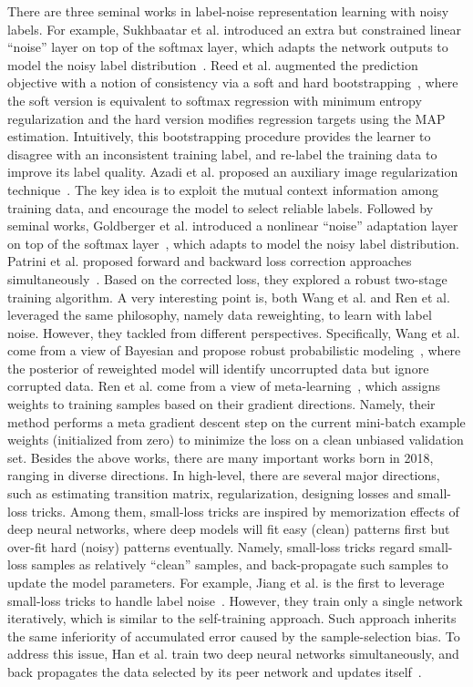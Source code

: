 There are three seminal works in label-noise representation learning with noisy labels. For example, Sukhbaatar et al. introduced an extra but constrained linear ``noise'' layer on top of the softmax layer, which adapts the network outputs to model the noisy label distribution~. Reed et al. augmented the prediction objective with a notion of consistency via a soft and hard bootstrapping~, where the soft version is equivalent to softmax regression with minimum entropy regularization and the hard version modifies regression targets using the MAP estimation. Intuitively, this bootstrapping procedure provides the learner to disagree with an inconsistent training label, and re-label the training data to improve its label quality. Azadi et al. proposed an auxiliary image regularization technique~. The key idea is to exploit the mutual context information among training data, and encourage the model to select reliable labels.
Followed by seminal works, Goldberger et al. introduced a nonlinear ``noise'' adaptation layer on top of the softmax layer~, which adapts to model the noisy label distribution. Patrini et al. proposed forward and backward loss correction approaches simultaneously~. Based on the corrected loss, they explored a robust two-stage training algorithm. A very interesting point is, both Wang et al. and Ren et al. leveraged the same philosophy, namely data reweighting, to learn with label noise. However, they tackled from different perspectives. Specifically, Wang et al. come from a view of Bayesian and propose robust probabilistic modeling~, where the posterior of reweighted model will identify uncorrupted data but ignore corrupted data. Ren et al. come from a view of meta-learning~, which assigns weights to training samples based on their gradient directions. Namely, their method performs a meta gradient descent step on the current mini-batch example weights (initialized from zero) to minimize the loss on a clean unbiased validation set.
Besides the above works, there are many important works born in 2018, ranging in diverse directions. In high-level, there are several major directions, such as estimating transition matrix, regularization, designing losses and small-loss tricks. Among them, small-loss tricks are inspired by memorization effects of deep neural networks, where deep models will fit easy (clean) patterns first but over-fit hard (noisy) patterns eventually. Namely, small-loss tricks regard small-loss samples as relatively ``clean'' samples, and back-propagate such samples to update the model parameters. For example, Jiang et al. is the first to leverage small-loss tricks to handle label noise~. However, they train only a single network iteratively, which is similar to the self-training approach. Such approach inherits the same inferiority of accumulated error caused by the sample-selection bias. To address this issue, Han et al. train two deep neural networks simultaneously, and back propagates the data selected by its peer network and updates itself~.
